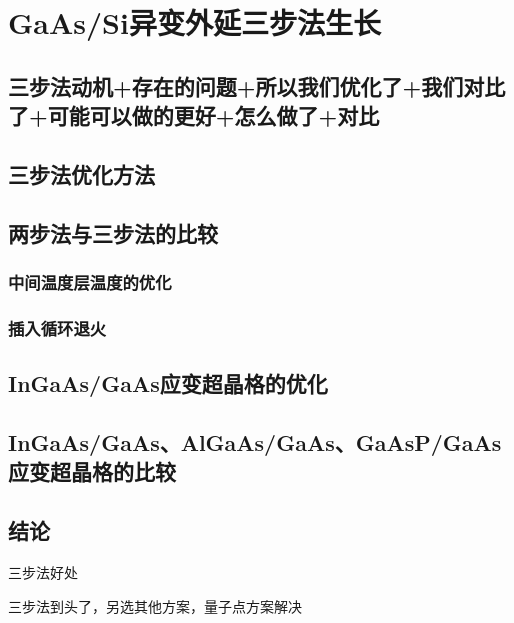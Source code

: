 % 

\chapter{GaAs/Si异变外延三步法生长}
\section{三步法动机+存在的问题+所以我们优化了+我们对比了+可能可以做的更好+怎么做了+对比}

\section{三步法优化方法}

\section{两步法与三步法的比较}

\subsection{中间温度层温度的优化}

\subsection{插入循环退火}

\section{InGaAs/GaAs应变超晶格的优化}

\section{InGaAs/GaAs、AlGaAs/GaAs、GaAsP/GaAs应变超晶格的比较}

\section{结论}

三步法好处

三步法到头了，另选其他方案，量子点方案解决

\ifx\usechapbib\empty


\fi

